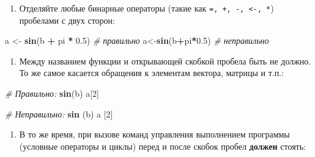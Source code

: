 \documentclass[]{book}
\newenvironment{Shaded}{\begin{snugshade}}{\end{snugshade}}
\newcommand{\KeywordTok}[1]{\textcolor[rgb]{0.13,0.29,0.53}{\textbf{#1}}}
\newcommand{\DecValTok}[1]{\textcolor[rgb]{0.00,0.00,0.81}{#1}}
\newcommand{\FloatTok}[1]{\textcolor[rgb]{0.00,0.00,0.81}{#1}}
\newcommand{\StringTok}[1]{\textcolor[rgb]{0.31,0.60,0.02}{#1}}
\newcommand{\CommentTok}[1]{\textcolor[rgb]{0.56,0.35,0.01}{\textit{#1}}}
\newcommand{\OperatorTok}[1]{\textcolor[rgb]{0.81,0.36,0.00}{\textbf{#1}}}
\newcommand{\NormalTok}[1]{#1}
\providecommand{\tightlist}{%
  \setlength{\itemsep}{0pt}\setlength{\parskip}{0pt}}
\begin{document}
\begin{enumerate}
\def\labelenumi{\arabic{enumi}.}
\setcounter{enumi}{2}
\tightlist
\item
  Отделяйте любые бинарные операторы (такие как
  \texttt{=,\ +,\ -,\ \textless{}-,\ *}) пробелами с двух сторон:
\end{enumerate}

\begin{Shaded}
\begin{Highlighting}[]
\NormalTok{a <-}\StringTok{ }\KeywordTok{sin}\NormalTok{(b }\OperatorTok{+}\StringTok{ }\NormalTok{pi }\OperatorTok{*}\StringTok{ }\FloatTok{0.5}\NormalTok{) }\CommentTok{# правильно}
\NormalTok{a<-}\KeywordTok{sin}\NormalTok{(b}\OperatorTok{+}\NormalTok{pi}\OperatorTok{*}\FloatTok{0.5}\NormalTok{) }\CommentTok{# неправильно}
\end{Highlighting}
\end{Shaded}

\begin{enumerate}
\def\labelenumi{\arabic{enumi}.}
\setcounter{enumi}{3}
\tightlist
\item
  Между названием функции и открывающей скобкой пробела быть не должно.
  То же самое касается обращения к элементам вектора, матрицы и т.п.:
\end{enumerate}

\begin{Shaded}
\begin{Highlighting}[]
\CommentTok{# Правильно:}
\KeywordTok{sin}\NormalTok{(b)}
\NormalTok{a[}\DecValTok{2}\NormalTok{]}

\CommentTok{# Неправильно:}
\KeywordTok{sin}\NormalTok{ (b)}
\NormalTok{a [}\DecValTok{2}\NormalTok{]}
\end{Highlighting}
\end{Shaded}

\begin{enumerate}
\def\labelenumi{\arabic{enumi}.}
\setcounter{enumi}{4}
\tightlist
\item
  В то же время, при вызове команд управления выполнением программы
  (условные операторы и циклы) перед и после скобок пробел
  \textbf{должен} стоять:
\end{enumerate}
\end{document}
